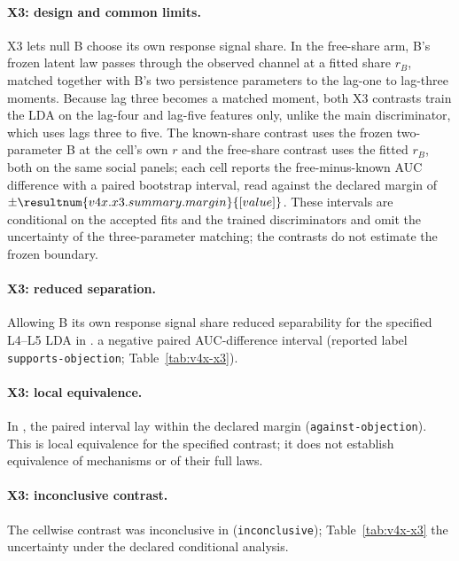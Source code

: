 \paragraph{X3: design and common limits.}
X3 lets null B choose its own response signal share. In the free-share arm, B's frozen latent law passes through the observed channel at a fitted share $r_B$, matched together with B's two persistence parameters to the lag-one to lag-three moments. Because lag three becomes a matched moment, both X3 contrasts train the LDA on the lag-four and lag-five features only, unlike the main discriminator, which uses lags three to five. The known-share contrast uses the frozen two-parameter B at the cell's own $r$ and the free-share contrast uses the fitted $r_B$, both on the same social panels; each cell reports the free-minus-known AUC difference with a paired bootstrap interval, read against the declared margin of $\pm\resultnum{v4x.x3.summary.margin}{[value]}$.
These intervals are conditional on the accepted fits and the trained discriminators and omit the uncertainty of the three-parameter matching; the contrasts do not estimate the frozen boundary.

\paragraph{X3: reduced separation.}
Allowing B its own response signal share reduced separability for the specified L4--L5 LDA in  .  a negative paired AUC-difference interval (reported label \texttt{supports-objection}; Table~\ref{tab:v4x-x3}).

\paragraph{X3: local equivalence.}
In  , the paired interval lay within the declared margin (\texttt{against-objection}).
This is local equivalence for the specified contrast; it does not establish equivalence of mechanisms or of their full laws.

\paragraph{X3: inconclusive contrast.}
The cellwise contrast was inconclusive in   (\texttt{inconclusive});  Table~\ref{tab:v4x-x3}  the uncertainty under the declared conditional analysis.

